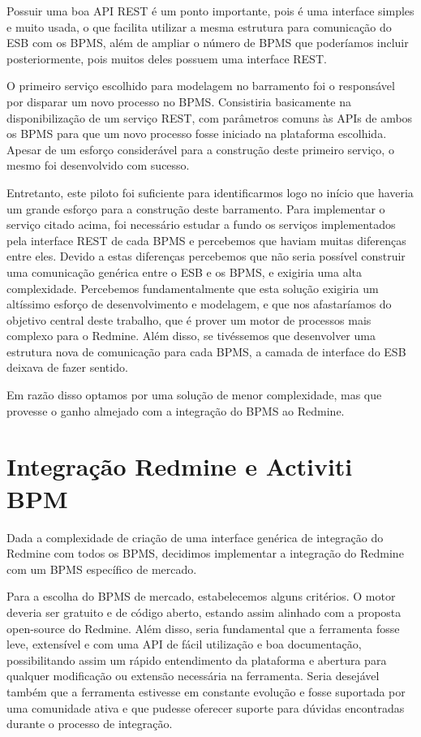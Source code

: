 Possuir uma boa API REST\cite{rest} é um ponto importante, pois é uma interface simples e muito usada, o que facilita utilizar a mesma estrutura para comunicação do ESB com os BPMS, além de ampliar o número de BPMS que poderíamos incluir posteriormente, pois muitos deles possuem uma interface REST.

O primeiro serviço escolhido para modelagem no barramento foi o responsável por disparar um novo processo no BPMS. Consistiria basicamente na disponibilização de um serviço REST, com parâmetros comuns às APIs de ambos os BPMS para que um novo processo fosse iniciado na plataforma escolhida. Apesar de um esforço considerável para a construção deste primeiro serviço, o mesmo foi desenvolvido com sucesso.  

Entretanto, este piloto foi suficiente para identificarmos logo no início que haveria um grande esforço para a construção deste barramento. Para implementar o serviço citado acima, foi necessário estudar a fundo os serviços implementados pela interface REST de cada BPMS e percebemos que haviam muitas diferenças entre eles. Devido a estas diferenças percebemos que não seria possível construir uma comunicação genérica entre o ESB e os BPMS, e exigiria uma alta complexidade. Percebemos fundamentalmente que esta solução exigiria um altíssimo esforço de desenvolvimento e modelagem, e que nos afastaríamos do objetivo central deste trabalho, que é prover um motor de processos mais complexo para o Redmine. Além disso, se tivéssemos que desenvolver uma estrutura nova de comunicação para cada BPMS, a camada de interface do ESB deixava de fazer sentido.

Em razão disso optamos por uma solução de menor complexidade, mas que provesse o ganho almejado com a integração do BPMS ao Redmine.

\section{Integração Redmine e Activiti BPM}\label{sec:activiti-bpm}

Dada a complexidade de criação de uma interface genérica de integração do Redmine com todos os BPMS, decidimos implementar a integração do Redmine com um BPMS específico de mercado. 

Para a escolha do BPMS de mercado, estabelecemos alguns critérios. O motor deveria ser gratuito e de código aberto, estando assim alinhado com a proposta open-source do Redmine. Além disso, seria fundamental que a ferramenta fosse leve, extensível e com uma API de fácil utilização e boa documentação, possibilitando assim um rápido entendimento da plataforma e abertura para qualquer modificação ou extensão necessária na ferramenta. Seria desejável também que a ferramenta estivesse em constante evolução e fosse suportada por uma comunidade ativa e que pudesse oferecer suporte para dúvidas encontradas durante o processo de integração.

